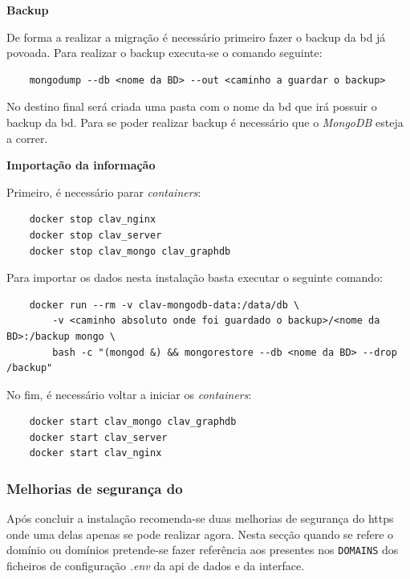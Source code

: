 \begin{description}
    \item \textbf{Backup}

    De forma a realizar a migração é necessário primeiro fazer o backup da \acrshort{bd} já povoada. Para realizar o backup executa-se o comando seguinte:
    \footnotesize
    \begin{verbatim}
    mongodump --db <nome da BD> --out <caminho a guardar o backup>
    \end{verbatim}
    \normalsize
    \vspace{-0.5cm}
    No destino final será criada uma pasta com o nome da \acrshort{bd} que irá possuir o backup da \acrshort{bd}.
    Para se poder realizar backup é necessário que o \textit{MongoDB} esteja a correr.
    \item \textbf{Importação da informação}

    Primeiro, é necessário parar \textit{containers}:
    \footnotesize
    \begin{verbatim}
    docker stop clav_nginx
    docker stop clav_server
    docker stop clav_mongo clav_graphdb
    \end{verbatim}
    \normalsize
    \vspace{-0.3cm}
    Para importar os dados nesta instalação basta executar o seguinte comando:
    \footnotesize
    \begin{verbatim}
    docker run --rm -v clav-mongodb-data:/data/db \
        -v <caminho absoluto onde foi guardado o backup>/<nome da BD>:/backup mongo \
        bash -c "(mongod &) && mongorestore --db <nome da BD> --drop /backup"
    \end{verbatim}
    \normalsize
    \vspace{-0.3cm}
    No fim, é necessário voltar a iniciar os \textit{containers}:
    \footnotesize
    \begin{verbatim}
    docker start clav_mongo clav_graphdb
    docker start clav_server
    docker start clav_nginx
    \end{verbatim}
    \normalsize
    \vspace{-0.5cm}
\end{description}

\subsubsection{Melhorias de segurança do }\label{sec:inst-melhorias}
Após concluir a instalação recomenda-se duas melhorias de segurança do \acrshort{https} onde uma delas apenas se pode realizar agora. Nesta secção quando se refere o domínio ou domínios pretende-se fazer referência aos presentes nos \texttt{DOMAINS} dos ficheiros de configuração \textit{.env} da \acrshort{api} de dados e da interface.


